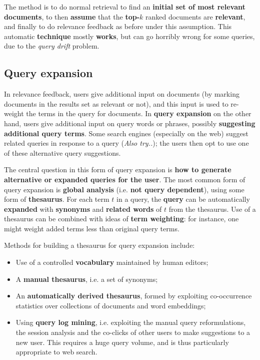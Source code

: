 The method is to do normal retrieval to find an \textbf{initial set of most relevant documents}, to then \textbf{assume} that the \textbf{top-$k$} ranked documents are \textbf{relevant}, and finally to do relevance feedback as before under this assumption. This automatic \textbf{technique} mostly \textbf{works}, but can go horribly wrong for some queries, due to the \textit{query drift} problem.

\subsection{Query expansion}
In relevance feedback, users give additional input on documents (by marking documents in the results set as relevant or not), and this input is used to re-weight the terms in the query for documents. In \textbf{query expansion} on the other hand, users give additional input on query words or phrases, possibly \textbf{suggesting additional query terms}. Some search engines (especially on the web) suggest related queries in response to a query (\textit{Also try..}); the users then opt to use one of these alternative query suggestions.

The central question in this form of query expansion is \textbf{how to generate alternative or expanded queries for the user}. The most common form of query expansion is \textbf{global analysis} (i.e. \textbf{not query dependent}), using some form of \textbf{thesaurus}. For each term $t$ in a query, the \textbf{query} can be automatically \textbf{expanded} with \textbf{synonyms} and \textbf{related words} of $t$ from the thesaurus. Use of a thesaurus can be combined with ideas of \textbf{term weighting}: for instance, one might weight added terms less than original query terms.

Methods for building a thesaurus for query expansion include:

\begin{itemize}
    \item Use of a controlled \textbf{vocabulary} maintained by human editors;
    \item A \textbf{manual thesaurus}, i.e. a set of synonyms;
    \item An \textbf{automatically derived thesaurus}, formed by exploiting co-occurrence statistics over collections of documents and word embeddings;
    \item Using \textbf{query log mining}, i.e. exploiting the manual query reformulations, the session analysis and the co-clicks of other users to make suggestions to a new user. This requires a huge query volume, and is thus particularly appropriate to web search.
\end{itemize}

